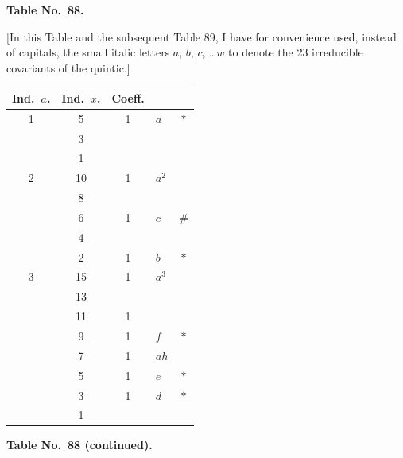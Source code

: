 \documentclass[11pt,a4paper]{article}
\begin{document}
\newpage
\setcounter{page}{343}

\begin{center}
\textbf{Table No.~88.}
\end{center}

[In this Table and the subsequent Table 89, I have for convenience used, instead of capitals, the small italic letters $a$, $b$, $c$, \ldots $w$ to denote the 23 irreducible covariants of the quintic.]

\begin{center}
\begin{tabular}{ccc|l|c}
Ind.\ $a$. & Ind.\ $x$. & Coeff. & & \\\hline
1 & 5 & 1 & $a$ & $*$\\
& 3 & & & \\
& 1 & & & \\
\hline
2 & 10 & 1 & $a^{2}$ & \\
& 8 & & & \\
& 6 & 1 & $c$ & $\#$\\
& 4 & & & \\
& 2 & 1 & $b$ & $*$\\
\hline
3 & 15 & 1 & $a^{3}$ & \\
& 13 & & & \\
& 11 & 1 & & \\
& 9 & 1 & $f$ & $*$\\
& 7 & 1 & $ah$ & \\
& 5 & 1 & $e$ & $*$\\
& 3 & 1 & $d$ & $*$\\
& 1 & & &
\end{tabular}
\end{center}

\newpage
\setcounter{page}{344}

\begin{center}
\textbf{Table No.~88 (continued).}
\end{center}
\end{document}
